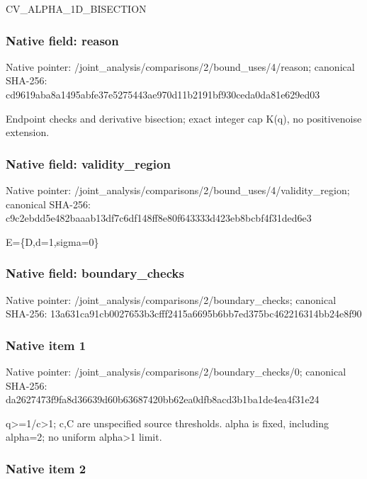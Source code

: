 \documentclass[10pt,a4paper]{article}
\begin{document}
CV\_ALPHA\_1D\_BISECTION


\subsubsection{Native field: reason}


Native pointer: /joint\_analysis/comparis\allowbreak{}ons/2/bound\_uses/4/reaso\allowbreak{}n; canonical SHA-256: cd9619aba8a1495abfe37e52\allowbreak{}75443ae970d11b2191bf930c\allowbreak{}eda0da81e629ed03


Endpoint checks and derivative bisection; exact integer cap K(q), no positivenoise extension.


\subsubsection{Native field: validity\_region}


Native pointer: /joint\_analysis/comparis\allowbreak{}ons/2/bound\_uses/4/valid\allowbreak{}ity\_region; canonical SHA-256: c9c2ebdd5e482baaab13df7c\allowbreak{}6df148ff8e80f643333d423e\allowbreak{}b8bcbf4f31ded6e3


E=\{D,d=1,sigma=0\}


\subsubsection{Native field: boundary\_checks}


Native pointer: /joint\_analysis/comparis\allowbreak{}ons/2/boundary\_checks; canonical SHA-256: 13a631ca91cb0027653b3cff\allowbreak{}f2415a6695b6bb7ed375bc46\allowbreak{}2216314bb24e8f90



\subsubsection{Native item 1}


Native pointer: /joint\_analysis/comparis\allowbreak{}ons/2/boundary\_checks/0; canonical SHA-256: da2627473f9fa8d36639d60b\allowbreak{}63687420bb62ea0dfb8acd3b\allowbreak{}1ba1de4ea4f31e24


q>=1/c>1; c,C are unspecified source thresholds. alpha is fixed, including alpha=2; no uniform alpha>1 limit.


\subsubsection{Native item 2}
\end{document}
